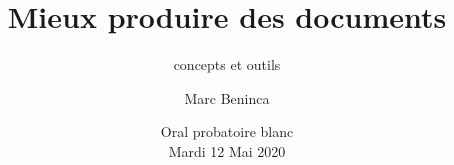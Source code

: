 
\usepackage{fontspec}
\setmainfont{DejaVu Sans}\setmonofont{DejaVu Sans Mono}

\usepackage{multicol}

\usepackage{listings}

\hypersetup{colorlinks,linkcolor=blue,urlcolor=blue}

\def\hititle{Mieux produire des documents}
\def\lotitle{concepts et outils}
\def\bititle{\hititle, \lotitle}

\title[\hititle]{\hititle}
\subtitle{\lotitle}
\author[M. Beninca]{Marc Beninca}
\date[Blanc 2020]{Oral probatoire blanc\\Mardi 12 Mai 2020}
